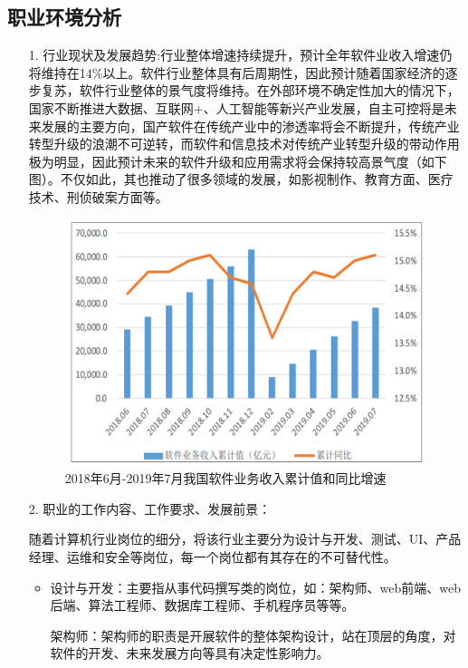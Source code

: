 \documentclass{article}
\begin{document}
\subsection{职业环境分析}
\begin{enumerate}
\item[1.] 行业现状及发展趋势:行业整体增速持续提升，预计全年软件业收入增速仍将维持在14\%以上。软件行业整体具有后周期性，因此预计随着国家经济的逐步复苏，软件行业整体的景气度将维持。在外部环境不确定性加大的情况下，国家不断推进大数据、互联网+、人工智能等新兴产业发展，自主可控将是未来发展的主要方向，国产软件在传统产业中的渗透率将会不断提升，传统产业转型升级的浪潮不可逆转，而软件和信息技术对传统产业转型升级的带动作用极为明显，因此预计未来的软件升级和应用需求将会保持较高景气度（如下图）。不仅如此，其也推动了很多领域的发展，如影视制作、教育方面、医疗技术、刑侦破案方面等。\citep{申子明2019计算机应用现状与计算机发展趋势}
\begin{figure}[!h]
\centering
\includegraphics[scale=0.4]{ruanjian}
\caption{2018年6月-2019年7月我国软件业务收入累计值和同比增速}
\end{figure}
\item[2.] 职业的工作内容、工作要求、发展前景：\par
随着计算机行业岗位的细分，将该行业主要分为设计与开发、测试、UI、产品经理、运维和安全等岗位，每一个岗位都有其存在的不可替代性。\par
\begin{itemize}
\item  设计与开发：主要指从事代码撰写类的岗位，如：架构师、web前端、web后端、算法工程师、数据库工程师、手机程序员等等。\par
架构师：架构师的职责是开展软件的整体架构设计，站在顶层的角度，对软件的开发、未来发展方向等具有决定性影响力。\par

\end{itemize}
\end{enumerate}
\end{document}
